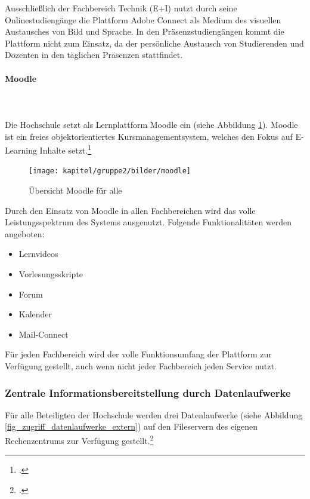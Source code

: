 Ausschließlich der Fachbereich Technik (E+I) nutzt durch seine Onlinestudiengänge die Plattform Adobe Connect als Medium des visuellen Austausches von Bild und Sprache. In den Präsenzstudiengängen kommt die Plattform nicht zum Einsatz, da der persönliche Austausch von Studierenden und Dozenten in den täglichen Präsenzen stattfindet.

\paragraph{Moodle}\mbox{}\\\\
\label{paragraph_moodle}
Die Hochschule setzt als Lernplattform Moodle ein (siehe Abbildung \ref{fig_moodle}). Moodle ist ein freies objektorientiertes Kursmanagementsystem, welches den Fokus auf E-Learning Inhalte setzt.\footcite{hsel_moodle_2015}

\begin{figure}[h!]
	\centering
	\texttt{[image: kapitel/gruppe2/bilder/moodle]}
	\caption{Übersicht Moodle für alle \protect\footnotemark}
	\label{fig_moodle}
\end{figure}

Durch den Einsatz von Moodle in allen Fachbereichen wird das volle Leistungsspektrum des Systems ausgenutzt. Folgende Funktionalitäten werden angeboten:

\begin{itemize}
	\item Lernvideos
	\item Vorlesungsskripte
	\item Forum
	\item Kalender
	\item Mail-Connect
\end{itemize}

Für jeden Fachbereich wird der volle Funktionsumfang der Plattform zur Verfügung gestellt, auch wenn nicht jeder Fachbereich jeden Service nutzt. 

\subsubsection{Zentrale Informationsbereitstellung durch Datenlaufwerke}
\label{zentrale_Datenlaufwerke}
Für alle Beteiligten der Hochschule werden drei Datenlaufwerke (siehe Abbildung \ref{fig_zugriff_datenlaufwerke_extern}) auf den Fileservern des eigenen Rechenzentrums zur Verfügung gestellt.\footcite{hsel_moodle_welcome_2015}


